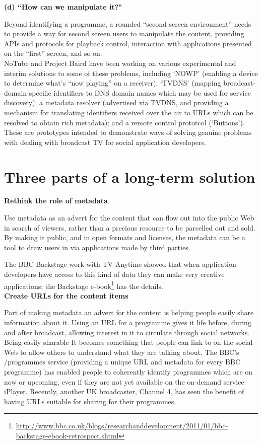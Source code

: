 \documentclass[]{article}%
\begin{document}
{\bf{(d) ``How can we manipulate it?"}}

Beyond identifying a programme, a rounded ``second screen environment'' needs to provide a way for second screen users to manipulate the content, providing APIs and protocols for playback control, interaction with applications presented on the ``first'' screen, and so on.
\\

NoTube and Project Baird have been working on various experimental and interim solutions to some of these problems, including  `NOWP' (enabling a device to determine what's ``now playing'' on a receiver);  `TVDNS' (mapping broadcast-domain-specific identifiers to DNS domain names which may be used for service discovery); a metadata resolver (advertised via TVDNS, and providing a mechanism for translating identifiers received over the air to URLs which can be resolved to obtain rich metadata); and a remote control prototcol (`Buttons'). These are prototypes intended to demonstrate ways of solving genuine problems with dealing with broadcast TV for social application developers. 

\section{Three parts of a long-term solution}

{\bf{Rethink the role of metadata}}

Use metadata as an advert for the content that can flow out into the public Web in search of viewers, rather than a precious resource to be parcelled out and sold. By making it public, and in open formats and licenses, the metadata can be a tool to draw users in via applications made by third parties.

The BBC Backstage work with TV-Anytime showed that when application developers have access to this kind of data they can make very creative applications: the Backstage e-book\footnote{\url{http://www.bbc.co.uk/blogs/researchanddevelopment/2011/01/bbc-backstage-ebook-retrospect.shtml}} has the details. 
\\

{\bf{Create URLs for the content items}}

Part of making metadata an advert for the content is helping people easily share information about it. Using an URL for a programme gives it life before, during and after broadcast, allowing interest in it to circulate through social networks. Being easily sharable It becomes something that people can link to on the social Web to allow others to understand what they are talking about.  The BBC's /programmes service (providing a unique URL and metadata for every BBC programme) has enabled people to coherently identify programmes which are on now or upcoming, even if they are not yet available on the on-demand service iPlayer. Recently, another UK broadcaster, Channel 4, has seen the benefit of having URLs suitable for sharing for their programmes.
\end{document}
